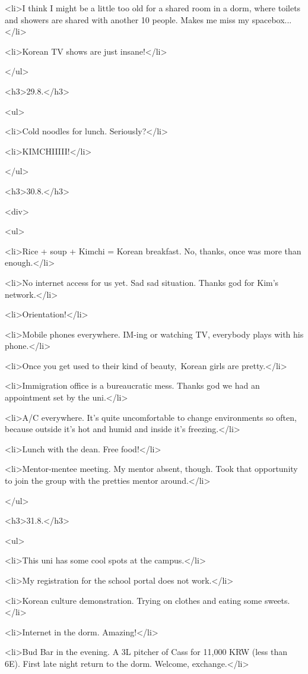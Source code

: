 \begin{post}
\begin{content}
	<li>I think I might be a little too old for a shared room in a dorm, where toilets and showers are shared with another 10 people. Makes me miss my spacebox...</li>

	<li>Korean TV shows are just insane!</li>

</ul>

<h3>29.8.</h3>

<ul>

	<li>Cold noodles for lunch. Seriously?</li>

	<li>KIMCHIIIII!</li>

</ul>

<h3>30.8.</h3>

<div>

<ul>

	<li>Rice + soup + Kimchi = Korean breakfast. No, thanks, once was more than enough.</li>

	<li>No internet access for us yet. Sad sad situation. Thanks god for Kim's network.</li>

	<li>Orientation!</li>

	<li>Mobile phones everywhere. IM-ing or watching TV, everybody plays with his phone.</li>

	<li>Once you get used to their kind of beauty, Korean girls are pretty.</li>

	<li>Immigration office is a bureaucratic mess. Thanks god we had an appointment set by the uni.</li>

	<li>A/C everywhere. It's quite uncomfortable to change environments so often, because outside it's hot and humid and inside it's freezing.</li>

	<li>Lunch with the dean. Free food!</li>

	<li>Mentor-mentee meeting. My mentor absent, though. Took that opportunity to join the group with the pretties mentor around.</li>

</ul>

<h3>31.8.</h3>

<ul>

	<li>This uni has some cool spots at the campus.</li>

	<li>My registration for the school portal does not work.</li>

	<li>Korean culture demonstration. Trying on clothes and eating some sweets.</li>

	<li>Internet in the dorm. Amazing!</li>

	<li>Bud Bar in the evening. A 3L pitcher of Cass for 11,000 KRW (less than 6E). First late night return to the dorm. Welcome, exchange.</li>


\end{content}
\end{post}

